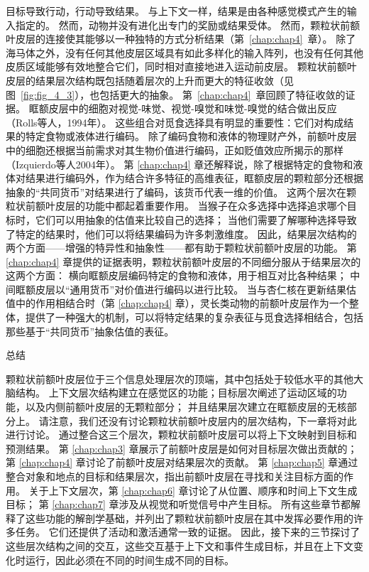 目标导致行动，行动导致结果。
与上下文一样，结果是由各种感觉模式产生的输入指定的。
然而，动物并没有进化出专门的奖励或结果受体。
然而，颗粒状前额叶皮层的连接使其能够以一种独特的方式分析结果（第~\ref{chap:chap4}~章）。
除了海马体之外，没有任何其他皮层区域具有如此多样化的输入阵列，也没有任何其他皮质区域能够有效地整合它们，同时相对直接地进入运动前皮层。
颗粒状前额叶皮层的结果层次结构既包括随着层次的上升而更大的特征收敛（见图~\ref{fig:fig_4_3}），也包括更大的抽象。
第~\ref{chap:chap4}~章回顾了特征收敛的证据。
眶额皮层中的细胞对视觉-味觉、视觉-嗅觉和味觉-嗅觉的结合做出反应（Rolls等人，1994年）。
这些组合对觅食选择具有明显的重要性：它们对构成结果的特定食物或液体进行编码。
除了编码食物和液体的物理财产外，前额叶皮层中的细胞还根据当前需求对其生物价值进行编码，正如贬值效应所揭示的那样（Izquierdo等人2004年）。
第 \ref{chap:chap4} 章还解释说，除了根据特定的食物和液体对结果进行编码外，作为结合许多特征的高维表征，眶额皮层的颗粒部分还根据抽象的“共同货币”对结果进行了编码，该货币代表一维的价值。
这两个层次在颗粒状前额叶皮层的功能中都起着重要作用。
当猴子在众多选择中选择追求哪个目标时，它们可以用抽象的估值来比较自己的选择；
当他们需要了解哪种选择导致了特定的结果时，他们可以将结果编码为许多刺激维度。
因此，结果层次结构的两个方面——增强的特异性和抽象性——都有助于颗粒状前额叶皮层的功能。
第 \ref{chap:chap4} 章提供的证据表明，颗粒状前额叶皮层的不同细分服从于结果层次的这两个方面：
横向眶额皮层编码特定的食物和液体，用于相互对比各种结果；
中间眶额皮层以“通用货币”对价值进行编码以进行比较。
当与杏仁核在更新结果估值中的作用相结合时（第 \ref{chap:chap4} 章），灵长类动物的前额叶皮层作为一个整体，提供了一种强大的机制，可以将特定结果的复杂表征与觅食选择相结合，包括那些基于“共同货币”抽象估值的表征。



总结

颗粒状前额叶皮层位于三个信息处理层次的顶端，其中包括处于较低水平的其他大脑结构。
上下文层次结构建立在感觉区的功能；目标层次阐述了运动区域的功能，以及内侧前额叶皮层的无颗粒部分；
并且结果层次建立在眶额皮层的无核部分上。
请注意，我们还没有讨论颗粒状前额叶皮层内的层次结构，下一章将对此进行讨论。
通过整合这三个层次，颗粒状前额叶皮层可以将上下文映射到目标和预测结果。
第 \ref{chap:chap3} 章展示了前额叶皮层是如何对目标层次做出贡献的；
第 \ref{chap:chap4} 章讨论了前额叶皮层对结果层次的贡献。
第 \ref{chap:chap5} 章通过整合对象和地点的目标和结果层次，指出前额叶皮层在寻找和关注目标方面的作用。
关于上下文层次，第 \ref{chap:chap6} 章讨论了从位置、顺序和时间上下文生成目标；
第 \ref{chap:chap7} 章涉及从视觉和听觉信号中产生目标。
所有这些章节都解释了这些功能的解剖学基础，并列出了颗粒状前额叶皮层在其中发挥必要作用的许多任务。
它们还提供了活动和激活通常一致的证据。
因此，接下来的三节探讨了这些层次结构之间的交互，这些交互基于上下文和事件生成目标，并且在上下文变化时运行，因此必须在不同的时间生成不同的目标。



